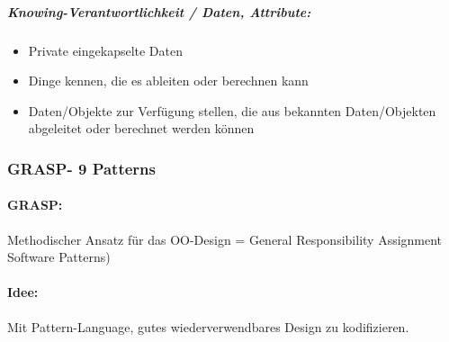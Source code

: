 \documentclass[../ZF_SWEN1.tex]{subfiles}
\begin{document}
\subparagraph{\textcolor {BrickRed}{\textbf{Knowing-Verantwortlichkeit / Daten, Attribute: }}}
\begin{itemize}
	\item Private eingekapselte Daten
	\item Dinge kennen, die es ableiten oder berechnen kann
	\item Daten/Objekte zur Verfügung stellen, die aus bekannten Daten/Objekten abgeleitet oder berechnet werden können
\end{itemize}



\subsubsection{GRASP- 9 Patterns}

\paragraph{GRASP:} Methodischer Ansatz für das OO-Design = General Responsibility Assignment Software Patterns)

\paragraph{Idee:} Mit Pattern-Language, gutes wiederverwendbares Design zu kodifizieren.
\end{document}
